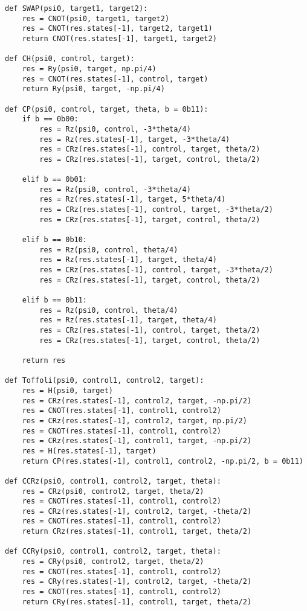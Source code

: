\begin{verbatim}
def SWAP(psi0, target1, target2):
    res = CNOT(psi0, target1, target2)
    res = CNOT(res.states[-1], target2, target1)
    return CNOT(res.states[-1], target1, target2)

def CH(psi0, control, target):
    res = Ry(psi0, target, np.pi/4)
    res = CNOT(res.states[-1], control, target)
    return Ry(psi0, target, -np.pi/4)

def CP(psi0, control, target, theta, b = 0b11):
    if b == 0b00:
        res = Rz(psi0, control, -3*theta/4)
        res = Rz(res.states[-1], target, -3*theta/4)
        res = CRz(res.states[-1], control, target, theta/2)
        res = CRz(res.states[-1], target, control, theta/2)

    elif b == 0b01:
        res = Rz(psi0, control, -3*theta/4)
        res = Rz(res.states[-1], target, 5*theta/4)
        res = CRz(res.states[-1], control, target, -3*theta/2)
        res = CRz(res.states[-1], target, control, theta/2)

    elif b == 0b10:
        res = Rz(psi0, control, theta/4)
        res = Rz(res.states[-1], target, theta/4)
        res = CRz(res.states[-1], control, target, -3*theta/2)
        res = CRz(res.states[-1], target, control, theta/2)

    elif b == 0b11:
        res = Rz(psi0, control, theta/4)
        res = Rz(res.states[-1], target, theta/4)
        res = CRz(res.states[-1], control, target, theta/2)
        res = CRz(res.states[-1], target, control, theta/2)

    return res

def Toffoli(psi0, control1, control2, target):
    res = H(psi0, target)
    res = CRz(res.states[-1], control2, target, -np.pi/2)
    res = CNOT(res.states[-1], control1, control2)
    res = CRz(res.states[-1], control2, target, np.pi/2)
    res = CNOT(res.states[-1], control1, control2)
    res = CRz(res.states[-1], control1, target, -np.pi/2)
    res = H(res.states[-1], target)
    return CP(res.states[-1], control1, control2, -np.pi/2, b = 0b11)

def CCRz(psi0, control1, control2, target, theta):
    res = CRz(psi0, control2, target, theta/2)
    res = CNOT(res.states[-1], control1, control2)
    res = CRz(res.states[-1], control2, target, -theta/2)
    res = CNOT(res.states[-1], control1, control2)
    return CRz(res.states[-1], control1, target, theta/2)

def CCRy(psi0, control1, control2, target, theta):
    res = CRy(psi0, control2, target, theta/2)
    res = CNOT(res.states[-1], control1, control2)
    res = CRy(res.states[-1], control2, target, -theta/2)
    res = CNOT(res.states[-1], control1, control2)
    return CRy(res.states[-1], control1, target, theta/2)


\end{verbatim}
